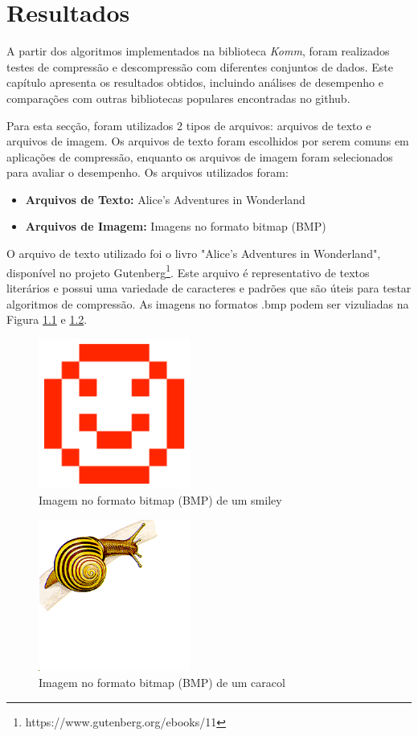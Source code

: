 \chapter{Resultados}\label{cap:Resultados}
A partir dos algoritmos implementados na biblioteca \textit{Komm}, foram realizados testes de compressão e descompressão com diferentes conjuntos de dados. Este capítulo apresenta os resultados obtidos, incluindo análises de desempenho e comparações com outras bibliotecas populares encontradas no github.

Para esta secção, foram utilizados 2 tipos de arquivos: arquivos de texto e arquivos de imagem. Os arquivos de texto foram escolhidos por serem comuns em aplicações de compressão, enquanto os arquivos de imagem foram selecionados para avaliar o desempenho.
Os arquivos utilizados foram:
\begin{itemize}
    \item \textbf{Arquivos de Texto:} Alice’s Adventures in Wonderland
    \item \textbf{Arquivos de Imagem:} Imagens no formato bitmap (BMP)
\end{itemize}
O arquivo de texto utilizado foi o livro "Alice’s Adventures in Wonderland", disponível no projeto Gutenberg\footnote{https://www.gutenberg.org/ebooks/11}. Este arquivo é representativo de textos literários e possui uma variedade de caracteres e padrões que são úteis para testar algoritmos de compressão.
As imagens no formatos .bmp podem ser vizuliadas na Figura \ref{fig:smiley} e \ref{fig:snail}.

\begin{figure}[h]
	\centering
	\caption{Imagem no formato bitmap (BMP) de um smiley}
	\label{fig:smiley}
	\includegraphics[width=5cm]{figuras/smiley-large.png}
\end{figure}

\begin{figure}[h]
	\centering
	\caption{Imagem no formato bitmap (BMP) de um caracol}
	\label{fig:snail}
	\includegraphics[width=5cm]{figuras/snail.png}
\end{figure}

